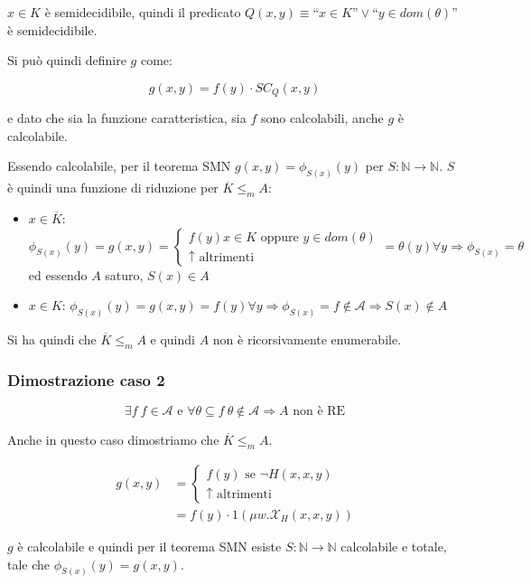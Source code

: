 $x \in K$ è semidecidibile, quindi il predicato $Q(x,y) \equiv \text{``}x \in K\text{''}\vee \text{``}y \in dom(\theta)\text{''}$ è semidecidibile.
 
Si può quindi definire $g$ come:

$$
g(x,y) = f(y) \cdot SC_Q(x,y)
$$
 
 e dato che sia la funzione caratteristica, sia $f$ sono calcolabili, anche $g$ è calcolabile.
 
 Essendo calcolabile, per il teorema SMN $ g(x,y) = \phi_{S(x)}(y)$ per $S : \mathbb{N} \rightarrow \mathbb{N}$. $S$ è quindi una funzione di riduzione per $\overline{K} \leq_m A$:
 
 \begin{itemize}
 	\item $x \in \overline{K}$: $\phi_{S(x)}(y) = g(x,y) = \begin{cases}
 	 f(y) x \in K \text{ oppure } y \in dom(\theta) \\
 	 \uparrow \text{ altrimenti}
 	\end{cases} = \theta(y) \forall y \Rightarrow \phi_{S(x)} = \theta$ ed essendo $A$ saturo, $S(x) \in A$
 	\item $x \in K$:  $\phi_{S(x)}(y) = g(x,y) = f(y) \forall y \Rightarrow \phi_{S(x)} = f \notin \mathcal{A} \Rightarrow S(x) \notin A$
 \end{itemize}
 
 Si ha quindi che $\overline{K} \leq_m A$ e quindi $A$ non è ricorsivamente enumerabile.
 
 \subsubsection{Dimostrazione caso 2}
 
$$
\exists f \: f \in \mathcal{A} \text{ e } \forall \theta \subseteq f \: \theta \notin \mathcal{A} \Rightarrow A \text{ non è RE}
$$
 
Anche in questo caso dimostriamo che $\overline{K} \leq_m A$.

\begin{align*}
g(x,y) &= \begin{cases}
f(y) \text{ se } \neg H(x,x,y) \\
\uparrow \text{ altrimenti}
\end{cases} \\
&= f(y) \cdot 1(\mu w.\mathcal{X}_H(x,x,y))
\end{align*}

$g$ è calcolabile e quindi per il teorema SMN esiste $S: \mathbb{N} \rightarrow \mathbb{N} $ calcolabile e totale, tale che $\phi_{S(x)}(y) = g(x,y)$.

